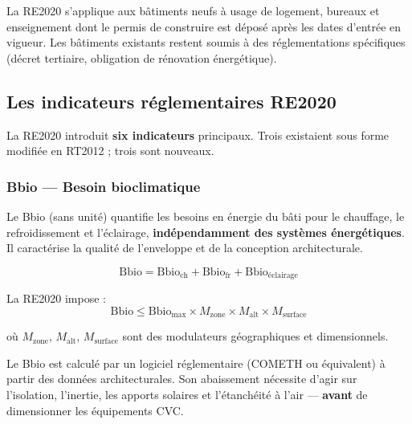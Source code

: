 \begin{definition}[title=Champ d'application de la RE2020]
La RE2020 s'applique aux bâtiments neufs à usage de logement, bureaux et enseignement dont le permis de construire est déposé après les dates d'entrée en vigueur. Les bâtiments existants restent soumis à des réglementations spécifiques (décret tertiaire, obligation de rénovation énergétique).
\end{definition}

\subsection{Les indicateurs réglementaires RE2020}

La RE2020 introduit \textbf{six indicateurs} principaux. Trois existaient sous forme modifiée en RT2012 ; trois sont nouveaux.

\subsubsection{Bbio — Besoin bioclimatique}

\begin{definition}[title=Bbio — Besoin bioclimatique conventionnel]
Le Bbio (sans unité) quantifie les besoins en énergie du bâti pour le chauffage, le refroidissement et l'éclairage, \textbf{indépendamment des systèmes énergétiques}. Il caractérise la qualité de l'enveloppe et de la conception architecturale.
\end{definition}

\begin{equation}
  \text{Bbio} = \text{Bbio}_{\text{ch}} + \text{Bbio}_{\text{fr}} + \text{Bbio}_{\text{éclairage}}
\end{equation}

La RE2020 impose :
\begin{equation}
  \text{Bbio} \leq \text{Bbio}_{\text{max}} \times M_{\text{zone}} \times M_{\text{alt}} \times M_{\text{surface}}
\end{equation}

où $M_{\text{zone}}$, $M_{\text{alt}}$, $M_{\text{surface}}$ sont des modulateurs géographiques et dimensionnels.

\begin{attention}
Le Bbio est calculé par un logiciel réglementaire (COMETH ou équivalent) à partir des données architecturales. Son abaissement nécessite d'agir sur l'isolation, l'inertie, les apports solaires et l'étanchéité à l'air — \textbf{avant} de dimensionner les équipements CVC.
\end{attention}


